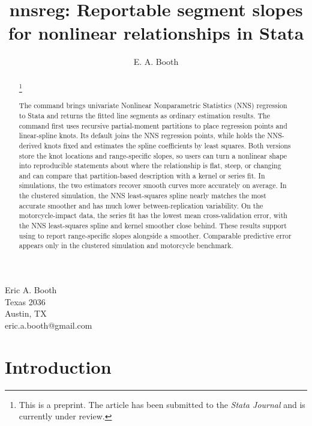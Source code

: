 \documentclass[bib]{statapress}
\newcommand\blfootnote[1]{%
  \begingroup
  \renewcommand\thefootnote{}\footnote{#1}%
  \addtocounter{footnote}{-1}%
  \endgroup
}
\begin{document}
\author{E. A. Booth}{%
  Eric A. Booth\\
  Texas 2036\\
  Austin, TX\\
  eric.a.booth@gmail.com
}
\title[nnsreg: Reportable segment slopes]{nnsreg: Reportable segment slopes for nonlinear relationships in Stata}
\maketitle

\begin{abstract}
\blfootnote{This is a preprint. The article has been submitted to the
\textit{Stata Journal} and is currently under review.}%
The  command brings univariate Nonlinear Nonparametric
Statistics (NNS) regression \citep{viole_nawrocki_2013} to Stata and returns
the fitted line segments as ordinary estimation results.  The command first
uses recursive partial-moment partitions to place regression points and
linear-spline knots.  Its default  joins the NNS
regression points, while  holds the NNS-derived knots fixed
and estimates the spline coefficients by least squares.  Both versions store
the knot locations and range-specific slopes, so users can turn a nonlinear
shape into reproducible statements about where the relationship is flat,
steep, or changing and can compare that partition-based description with a
kernel or series fit.  In simulations, the two  estimators
recover smooth curves more accurately on average.  In the clustered simulation,
the NNS least-squares spline nearly matches the most accurate smoother and has
much lower between-replication variability.  On the motorcycle-impact data,
the series fit has the lowest mean cross-validation error, with the NNS
least-squares spline and kernel smoother close behind.  These results support using  to
report range-specific slopes alongside a smoother.  Comparable predictive
error appears only in the clustered simulation and motorcycle benchmark.

\end{abstract}

\section{Introduction}
\end{document}
